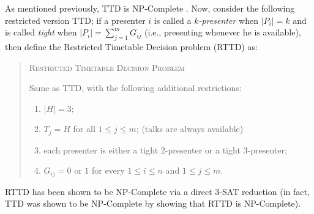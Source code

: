 \documentclass{svjour3}                     %
\begin{document}
As mentioned previously, TTD is NP-Complete \cite{even76}. Now, consider the following restricted version TTD; if a presenter $i$ is called a $k$\textit{-presenter} when $|P_i|=k$ and is called \textit{tight} when $|P_i|=\sum\limits_{j=1}^{m} G_{ij}$ (i.e., presenting whenever he is available), then define the Restricted Timetable Decision problem (RTTD) as:
\begin{quote}
	\textsc{Restricted Timetable Decision Problem}
	
	Same as TTD, with the following additional restrictions:
	\begin{enumerate}
		\item $|H|=3$;
		\item $T_j = H$ for all $1 \le j \le m$; (talks are always available)
		\item each presenter is either a tight 2-presenter or a tight 3-presenter;
		\item $G_{ij}=0$ or $1$ for every $1 \le i \le n$ and $1 \le j \le m$.
	\end{enumerate}
\end{quote}
RTTD has been shown to be NP-Complete via a direct 3-SAT reduction \cite{even76} (in fact, TTD was shown to be NP-Complete by showing that RTTD is NP-Complete).
\end{document}

